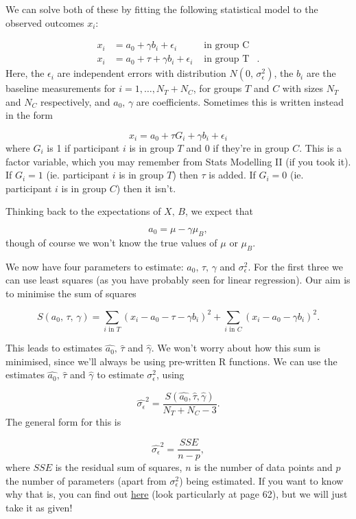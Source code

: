 \documentclass[
  openany]{book}
\theoremstyle{definition}
\theoremstyle{definition}
\theoremstyle{definition}
\theoremstyle{definition}
\theoremstyle{remark}
\begin{document}
We can solve both of these by fitting the following statistical model to the observed outcomes \(x_i\):

\[
\begin{aligned}
x_i & = a_0 + \gamma b_i + \epsilon_i & \text{ in group C}\\
x_i & = a_0 + \tau + \gamma b_i + \epsilon_i & \text{ in group T}&.
\end{aligned}
\]
Here, the \(\epsilon_i\) are independent errors with distribution \(N\left(0,\,\sigma^2_\epsilon\right)\), the \(b_i\) are the baseline measurements for \(i=1,\ldots,N_T+N_C\), for groups \(T\) and \(C\) with sizes \(N_T\) and \(N_C\) respectively, and \(a_0,\,\gamma\) are coefficients. Sometimes this is written instead in the form

\[ x_i = a_0 + \tau G_i+ \gamma b_i + \epsilon_i \]
where \(G_i\) is 1 if participant \(i\) is in group \(T\) and 0 if they're in group \(C\). This is a factor variable, which you may remember from Stats Modelling II (if you took it). If \(G_i=1\) (ie. participant \(i\) is in group \(T\)) then \(\tau\) is added. If \(G_i=0\) (ie. participant \(i\) is in group \(C\)) then it isn't.

Thinking back to the expectations of \(X,\,B\), we expect that

\[a_0 = \mu - \gamma\mu_B,\]
though of course we won't know the true values of \(\mu\) or \(\mu_B\).

We now have four parameters to estimate: \(a_0,\,\tau,\,\gamma\) and \(\sigma^2_\epsilon\). For the first three we can use least squares (as you have probably seen for linear regression). Our aim is to minimise the sum of squares

\[S\left(a_0,\, \tau,\,\gamma\right) = \sum\limits_{i\text{ in }T} \left(x_i - a_0 - \tau - \gamma b_i\right)^2 + \sum\limits_{i\text{ in }C} \left(x_i - a_0 - \gamma b_i\right)^2.\]

This leads to estimates \(\hat{a_0},\, \hat{\tau}\) and \(\hat{\gamma}\). We won't worry about how this sum is minimised, since we'll always be using pre-written R functions. We can use the estimates \(\hat{a_0},\, \hat{\tau}\) and \(\hat{\gamma}\) to estimate \(\sigma^2_\epsilon\), using

\[\hat{\sigma_\epsilon}^2 = \frac{S\left(\hat{a_0},\hat{\tau}, \hat{\gamma}\right)}{N_T + N_C -3}.\]
The general form for this is

\[ \hat{\sigma_\epsilon}^2 = \frac{SSE}{n-p},\]
where \(SSE\) is the residual sum of squares, \(n\) is the number of data points and \(p\) the number of parameters (apart from \(\sigma_\epsilon^2\)) being estimated. If you want to know why that is, you can find out \href{https://pages.stern.nyu.edu/~wgreene/MathStat/GreeneChapter4.pdf}{here} (look particularly at page 62), but we will just take it as given!
\end{document}
